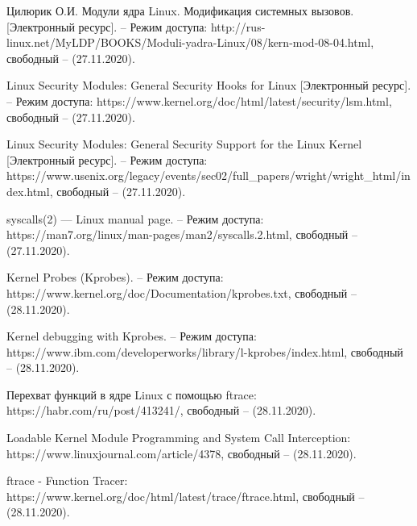 \documentclass[a4paper,14pt]{article}
\begin{document}
\newpage
\begin{thebibliography}{3}

Цилюрик О.И. Модули ядра Linux. Модификация системных вызовов. [Электронный ресурс]. -- Режим доступа: http://rus-linux.net/MyLDP/BOOKS/Moduli-yadra-Linux/08/kern-mod-08-04.html, свободный -- (27.11.2020).

Linux Security Modules: General Security Hooks for Linux [Электронный ресурс]. -- Режим доступа: https://www.kernel.org/doc/html/latest/security/lsm.html, свободный -- (27.11.2020).

Linux Security Modules:
General Security Support for the Linux Kernel [Электронный ресурс]. -- Режим доступа: https://www.usenix.org/legacy/events/sec02/full\_papers/wright/wright\_html/index.html, свободный -- (27.11.2020).

syscalls(2) — Linux manual page. -- Режим доступа: https://man7.org/linux/man-pages/man2/syscalls.2.html, свободный -- (27.11.2020).

Kernel Probes (Kprobes). -- Режим доступа: https://www.kernel.org/doc/Documentation/kprobes.txt, свободный -- (28.11.2020).

Kernel debugging with Kprobes. -- Режим доступа: https://www.ibm.com/developerworks/library/l-kprobes/index.html, свободный -- (28.11.2020).

Перехват функций в ядре Linux с помощью ftrace: https://habr.com/ru/post/413241/, свободный -- (28.11.2020).

Loadable Kernel Module Programming and System Call Interception: https://www.linuxjournal.com/article/4378, свободный -- (28.11.2020).

ftrace - Function Tracer: https://www.kernel.org/doc/html/latest/trace/ftrace.html, свободный -- (28.11.2020).




\end{thebibliography}
\end{document}
